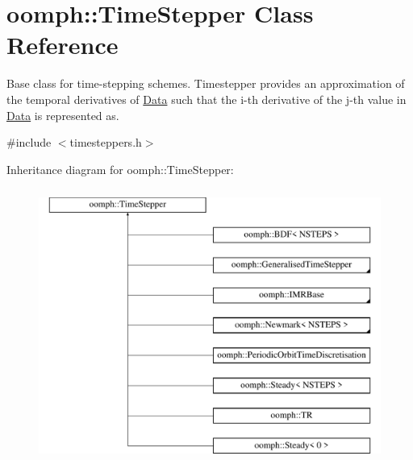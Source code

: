 \hypertarget{classoomph_1_1TimeStepper}{}\section{oomph\+:\+:Time\+Stepper Class Reference}
\label{classoomph_1_1TimeStepper}


Base class for time-\/stepping schemes. Timestepper provides an approximation of the temporal derivatives of \hyperlink{classoomph_1_1Data}{Data} such that the i-\/th derivative of the j-\/th value in \hyperlink{classoomph_1_1Data}{Data} is represented as.  




{\ttfamily \#include $<$timesteppers.\+h$>$}

Inheritance diagram for oomph\+:\+:Time\+Stepper\+:\begin{figure}[H]
\begin{center}
\leavevmode
\includegraphics[height=9.000000cm]{classoomph_1_1TimeStepper}
\end{center}
\end{figure}
